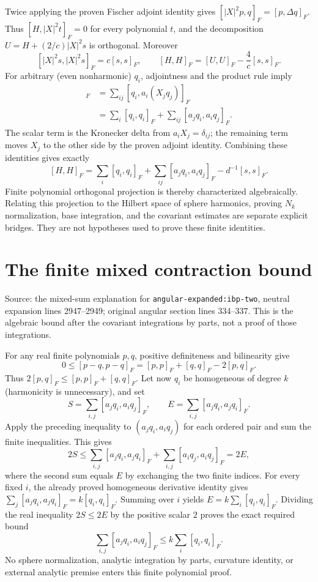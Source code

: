 \documentclass[11pt]{article}
\theoremstyle{definition}
\theoremstyle{remark}
\numberwithin{equation}{section}
\begin{document}
Twice applying the proven Fischer adjoint identity gives
$[|X|^2p,q]_F=[p,\Delta q]_F$. Thus $[H,|X|^2t]_F=0$ for every polynomial
$t$, and the decomposition $U=H+(2/c)|X|^2s$ is orthogonal. Moreover
\[
 [|X|^2s,|X|^2s]_F=c[s,s]_F,
 \qquad [H,H]_F=[U,U]_F-\frac4c[s,s]_F.
\]
For arbitrary (even nonharmonic) $q_i$, adjointness and the product rule imply
\begin{align*}
 [U,U]_F
 &=\sum_{ij}[q_i,a_i(X_jq_j)]_F\\
 &=\sum_i[q_i,q_i]_F+\sum_{ij}[a_jq_i,a_iq_j]_F.
\end{align*}
The scalar term is the Kronecker delta from $a_iX_j=\delta_{ij}$; the
remaining term moves $X_j$ to the other side by the proven adjoint identity.
Combining these identities gives exactly
\[
 [H,H]_F=\sum_i[q_i,q_i]_F+
 \sum_{ij}[a_jq_i,a_iq_j]_F-d^{-1}[s,s]_F.
\]
Finite polynomial orthogonal projection is thereby characterized algebraically.
Relating this projection to the Hilbert space of sphere harmonics, proving
$N_k$ normalization, base integration, and the covariant estimates are separate
explicit bridges. They are not hypotheses used to prove these finite identities.
\section{The finite mixed contraction bound}
\label{fischer:mixed}
Source: the mixed-sum explanation for
\texttt{angular-expanded:ibp-two}, neutral expansion lines 2947--2949;
original angular section lines 334--337. This is the algebraic bound after
the covariant integrations by parts, not a proof of those integrations.

For any real finite polynomials $p,q$, positive definiteness and bilinearity give
\[
 0\leq[p-q,p-q]_F=[p,p]_F+[q,q]_F-2[p,q]_F.
\]
Thus $2[p,q]_F\leq[p,p]_F+[q,q]_F$. Let now $q_i$ be homogeneous of
degree $k$ (harmonicity is unnecessary), and set
\[
 S=\sum_{i,j}[a_jq_i,a_iq_j]_F,
 \qquad E=\sum_{i,j}[a_jq_i,a_jq_i]_F.
\]
Apply the preceding inequality to $(a_jq_i,a_iq_j)$ for each ordered pair
and sum the finite inequalities. This gives
\[
 2S\leq\sum_{i,j}[a_jq_i,a_jq_i]_F+
 \sum_{i,j}[a_iq_j,a_iq_j]_F=2E,
\]
where the second sum equals $E$ by exchanging the two finite indices.
For every fixed $i$, the already proved homogeneous derivative identity gives
$\sum_j[a_jq_i,a_jq_i]_F=k[q_i,q_i]_F$. Summing over $i$ yields
$E=k\sum_i[q_i,q_i]_F$. Dividing the real inequality $2S\leq2E$ by
the positive scalar $2$ proves the exact required bound
\[
 \sum_{i,j}[a_jq_i,a_iq_j]_F\leq k\sum_i[q_i,q_i]_F.
\]
No sphere normalization, analytic integration by parts, curvature identity,
or external analytic premise enters this finite polynomial proof.
\end{document}
